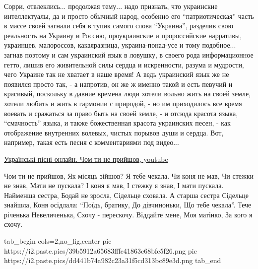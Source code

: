 Сорри, отвлеклись... продолжая тему... надо признать, что украинские
интеллектуалы, да и просто обычный народ, особенно его \enquote{патриотическая}
часть в массе своей загнали себя в тупик самого слова \enquote{Украина},
разделив свою реальность на Украину и Россию, проукраинские и пророссийские
нарративы, украинцев, малороссов, какаяразница, украина-понад-усе и тому
подобное... загнав поэтому и сам украинский язык в ловушку, в своего рода
информационное гетто, лишив его живительной силы сердца и искренности, разума и
мудрости, чего Украине так не хватает в наше время! А ведь украинский язык же
не появился просто так, - а напротив, он же ж именно такой и есть певучий и
красивый, поскольку в давние времена люди хотели вольно жить на своей земле,
хотели любить и жить в гармонии с природой, - но им приходилось все время
воевать и сражаться за право быть на своей земле, - и отсюда красота языка,
\enquote{смачность} языка,  и также божественная красота украинских песен, -
как отображение внутренних волевых, чистых порывов души и сердца. Вот,
например, такая есть песня с комментариями под видео... 

\href{https://www.youtube.com/watch?v=--iWRp8Jr6k}{%
Українські пісні онлайн. Чом ти не прийшов, youtube}

\raggedcolumns
\begin{multicols}{4} %
\setlength{\parindent}{0pt}
\obeycr
Чом ти не прийшов,
Як місяць зійшов?
Я тебе чекала.
Чи коня не мав,
Чи стежки не знав,
Мати не пускала?
\smallskip
І коня я мав,
І стежку я знав,
І мати пускала.
Найменша сестра,
Бодай не зросла,
Сідельце сховала.
\smallskip
А старша сестра
Сідельце знайшла,
Коня осідлала:
\enquote{Поїдь, братику,
До дівчиноньки,
Що тебе чекала}.
\smallskip
Тече річенька
Невеличенька,
Схочу - перескочу.
Віддайте мене,
Моя матінко,
За кого я схочу.
\restorecr
\end{multicols} %

\ifcmt
  tab_begin cols=2,no_fig,center
     pic https://i2.paste.pics/39b5912a65683fffc41863c68bfc5f26.png
     pic https://i2.paste.pics/dd441b74a982c23a31f5cd313bc89e3d.png
  tab_end
\fi


